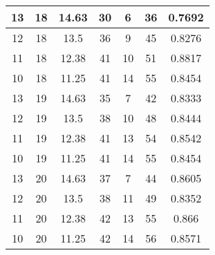 \documentclass[letterpaper, 12pt]{article}
\begin{document}
\begin{longtable}{|c|c|c|c|c|c|c|}
\hline
13 & 18 & 14.63 & 30 & 6 & 36 & 0.7692 \\
\hline
12 & 18 & 13.5 & 36 & 9 & 45 & 0.8276 \\
\hline
11 & 18 & 12.38 & 41 & 10 & 51 & 0.8817 \\
\hline
10 & 18 & 11.25 & 41 & 14 & 55 & 0.8454 \\
\hline
13 & 19 & 14.63 & 35 & 7 & 42 & 0.8333 \\
\hline
12 & 19 & 13.5 & 38 & 10 & 48 & 0.8444 \\
\hline
11 & 19 & 12.38 & 41 & 13 & 54 & 0.8542 \\
\hline
10 & 19 & 11.25 & 41 & 14 & 55 & 0.8454 \\
\hline
13 & 20 & 14.63 & 37 & 7 & 44 & 0.8605 \\
\hline
12 & 20 & 13.5 & 38 & 11 & 49 & 0.8352 \\
\hline
11 & 20 & 12.38 & 42 & 13 & 55 & 0.866 \\
\hline
10 & 20 & 11.25 & 42 & 14 & 56 & 0.8571 \\
\hline
\end{longtable}
\end{document}
